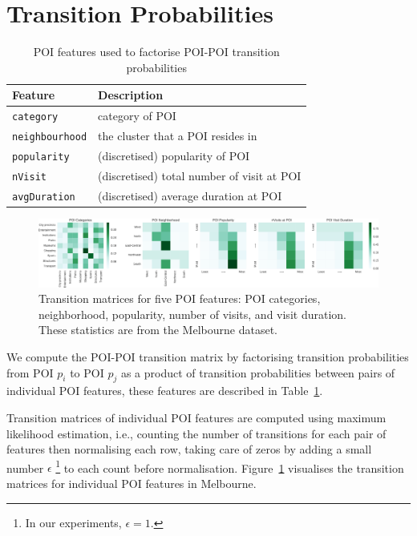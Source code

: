 \section{Transition Probabilities}

\begin{table}[ht]
\caption{POI features used to factorise POI-POI transition probabilities}
\label{tab:featuretran}
\centering
\setlength{\tabcolsep}{28pt} %
\begin{tabular}{l|l} \hline
\textbf{Feature}       & \textbf{Description} \\ \hline
\texttt{category}      & category of POI \\
\texttt{neighbourhood} & the cluster that a POI resides in \\
\texttt{popularity}    & (discretised) popularity of POI \\
\texttt{nVisit}        & (discretised) total number of visit at POI \\
\texttt{avgDuration}   & (discretised) average duration at POI \\ \hline
\end{tabular}
\end{table}


\begin{figure}[b]
\includegraphics[width=\textwidth]{fig/poi_transmat_all.png}
\caption{Transition matrices for five POI features: POI categories, neighborhood, popularity, number of visits, and visit duration. These statistics are from the Melbourne dataset.}
\label{fig:transmat_all}
\end{figure}

We compute the POI-POI transition matrix by factorising transition probabilities from POI $p_i$ to POI $p_j$ as a product of transition probabilities
between pairs of individual POI features, these features are described in Table~\ref{tab:featuretran}.

Transition matrices of individual POI features are computed using maximum likelihood estimation,
i.e., counting the number of transitions for each pair of features then normalising each row,
taking care of zeros by adding a small number $\epsilon$
\footnote{In our experiments, $\epsilon = 1$.}
to each count before normalisation.
Figure~\ref{fig:transmat_all} visualises the transition matrices for individual POI features in Melbourne.

